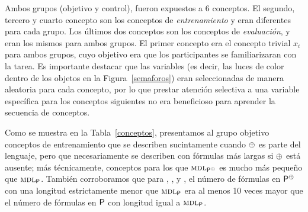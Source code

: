 Ambos grupos (objetivo y control), fueron expuestos a 6 conceptos. El segundo, tercero y cuarto concepto son los conceptos de {\em entrenamiento} y eran diferentes para cada grupo. Los últimos dos conceptos son los conceptos de {\em evaluación}, y eran los mismos para ambos grupos. El primer concepto era el concepto trivial $x_i$ para ambos grupos, cuyo objetivo era que los participantes se familiarizaran con la tarea. Es importante destacar que las variables (es decir, las luces de color dentro de los objetos en la Figura~\ref{semaforos}) eran seleccionadas de manera aleatoria para cada concepto, por lo que prestar atención selectiva a una variable específica para los conceptos siguientes no era beneficioso para aprender la secuencia de conceptos.


Como se muestra en la Tabla~\ref{conceptos}, presentamos al grupo objetivo conceptos de entrenamiento que se describen sucintamente cuando $\oplus$ es parte del lenguaje, pero que necesariamente se describen con fórmulas más largas si $\oplus$ está ausente; más técnicamente, conceptos para los que $\textsc{mdl}_{{\sf P}^\oplus}$ es mucho más pequeño que $\textsc{mdl}_{{\sf P}}$. También corroboramos que para \targetb, \targetc, \targetd y \testa, el número de fórmulas en ${\sf P}^\oplus$ con una longitud estrictamente menor que $\textsc{mdl}_{{\sf P}}$ era al menos 10 veces mayor que el número de fórmulas en ${\sf P}$ con longitud igual a $\textsc{mdl}_{{\sf P}}$.


